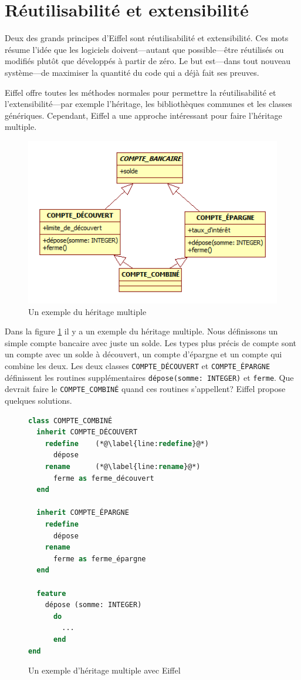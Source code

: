 \documentclass[french]{report}
\begin{document}
\section{Réutilisabilité et extensibilité}

Deux des grands principes d'Eiffel sont réutilisabilité et extensibilité. Ces mots résume l'idée que les logiciels doivent---autant que possible---être réutilisés ou modifiés plutôt que développés à partir de zéro. Le but est---dans tout nouveau système---de maximiser la quantité du code qui a déjà fait ses preuves.

Eiffel offre toutes les méthodes normales pour permettre la réutilisabilité et l'extensibilité---par exemple l'héritage, les bibliothèques communes et les classes génériques. Cependant, Eiffel a une approche intéressant pour faire l'héritage multiple.

\begin{figure}[h]
	\centering
	\includegraphics[width=0.7\linewidth]{multiple_inheritance}
	\caption{Un exemple du héritage multiple}
	\label{fig:multiple-inheritance}
\end{figure}

Dans la figure \ref{fig:multiple-inheritance} il y a un exemple du héritage multiple. Nous définissons un simple compte bancaire avec juste un solde. Les types plus précis de compte sont un compte avec un solde à découvert, un compte d'épargne et un compte qui combine les deux. Les deux classes \texttt{COMPTE\_DÉCOUVERT} et \texttt{COMPTE\_ÉPARGNE} définissent les routines supplémentaires \texttt{dépose(somme: INTEGER)} et \texttt{ferme}. Que devrait faire le \texttt{COMPTE\_COMBINÉ} quand ces routines s'appellent? Eiffel propose quelques solutions.


\begin{figure}[h]
	\begin{lstlisting}[language=Eiffel]
class COMPTE_COMBINÉ
  inherit COMPTE_DÉCOUVERT
    redefine	(*@\label{line:redefine}@*)
      dépose
    rename		(*@\label{line:rename}@*)
      ferme as ferme_découvert
  end
  
  inherit COMPTE_ÉPARGNE
    redefine
      dépose
    rename
      ferme as ferme_épargne
  end
  
  feature
    dépose (somme: INTEGER)
      do
        ...
      end
end
	\end{lstlisting}
	
	\caption{Un exemple d'héritage multiple avec Eiffel}
	\label{fig:multiple-inheritance-code}
\end{figure}
\end{document}
